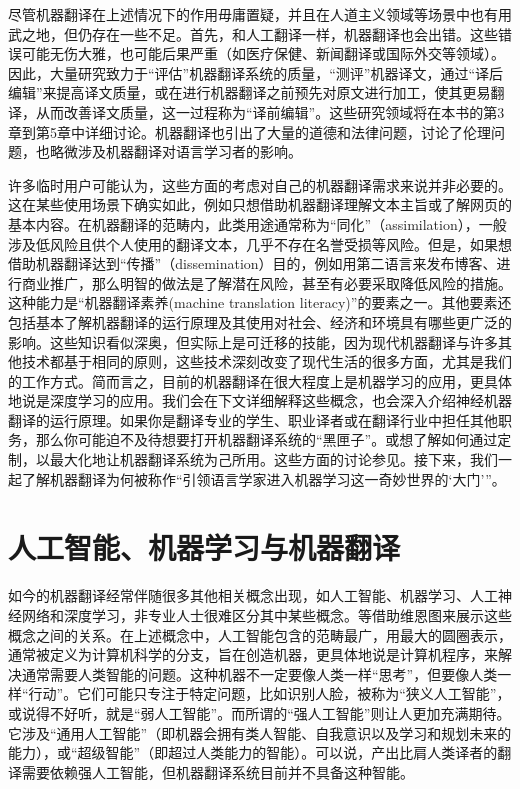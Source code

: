 \documentclass[output=paper]{langscibook}
\begin{document}
尽管机器翻译在上述情况下的作用毋庸置疑，并且在人道主义领域\citep{Nurminen2020}等场景中也有用武之地，但仍存在一些不足。首先，和人工翻译一样，机器翻译也会出错。这些错误可能无伤大雅，也可能后果严重（如医疗保健、新闻翻译或国际外交等领域）。因此，大量研究致力于“评估”机器翻译系统的质量，“测评”机器译文，通过“译后编辑”来提高译文质量，或在进行机器翻译之前预先对原文进行加工，使其更易翻译，从而改善译文质量，这一过程称为“译前编辑”。这些研究领域将在本书的第3章到第5章中详细讨论。机器翻译也引出了大量的道德和法律问题，讨论了伦理问题，也略微涉及机器翻译对语言学习者的影响。

许多临时用户可能认为，这些方面的考虑对自己的机器翻译需求来说并非必要的。这在某些使用场景下确实如此，例如只想借助机器翻译理解文本主旨或了解网页的基本内容。在机器翻译的范畴内，此类用途通常称为“同化”（assimilation），一般涉及低风险且供个人使用的翻译文本，几乎不存在名誉受损等风险。但是，如果想借助机器翻译达到“传播”（dissemination）目的，例如用第二语言来发布博客、进行商业推广，那么明智的做法是了解潜在风险，甚至有必要采取降低风险的措施。这种能力是“机器翻译素养(machine translation literacy)”的要素之一\citep{BowkerCiro2019}。其他要素还包括基本了解机器翻译的运行原理及其使用对社会、经济和环境具有哪些更广泛的影响。这些知识看似深奥，但实际上是可迁移的技能，因为现代机器翻译与许多其他技术都基于相同的原则，这些技术深刻改变了现代生活的很多方面，尤其是我们的工作方式。简而言之，目前的机器翻译在很大程度上是机器学习的应用，更具体地说是深度学习的应用。我们会在下文详细解释这些概念，也会深入介绍神经机器翻译的运行原理。如果你是翻译专业的学生、职业译者或在翻译行业中担任其他职务，那么你可能迫不及待想要打开机器翻译系统的“黑匣子”。或想了解如何通过定制，以最大化地让机器翻译系统为己所用。这些方面的讨论参见。接下来，我们一起了解机器翻译为何被称作“引领语言学家进入机器学习这一奇妙世界的‘大门’”。


\section{人工智能、机器学习与机器翻译}
如今的机器翻译经常伴随很多其他相关概念出现，如人工智能、机器学习、人工神经网络和深度学习，非专业人士很难区分其中某些概念。\cite{deeplearningbook}等借助维恩图来展示这些概念之间的关系。在上述概念中，人工智能包含的范畴最广，用最大的圆圈表示，通常被定义为计算机科学的分支，旨在创造机器，更具体地说是计算机程序，来解决通常需要人类智能的问题。这种机器不一定要像人类一样“思考”，但要像人类一样“行动”。它们可能只专注于特定问题，比如识别人脸，被称为“狭义人工智能”，或说得不好听，就是“弱人工智能”。而所谓的“强人工智能”则让人更加充满期待。它涉及“通用人工智能”（即机器会拥有类人智能、自我意识以及学习和规划未来的能力），或“超级智能”（即超过人类能力的智能）。可以说，产出比肩人类译者的翻译需要依赖强人工智能，但机器翻译系统目前并不具备这种智能。
\end{document}

